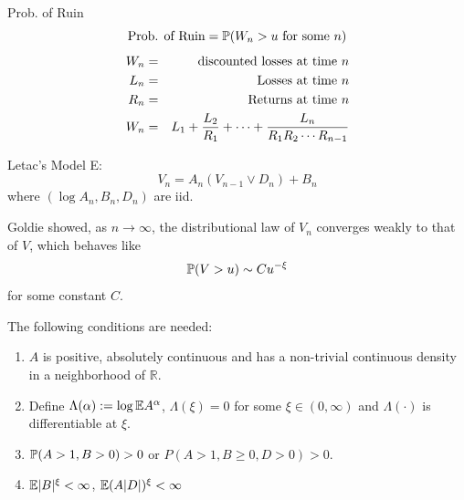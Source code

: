 \documentclass{beamer}
\begin{document}
\begin{frame}
  \begin{exampleblock}{Prob. of Ruin}
    \[
    \text{Prob. of Ruin} = \P(W_n > u \text{ for some }n)
    \]
    \begin{eqnarray*}
      W_n &=& \text{ discounted losses at time } n\\
      L_n &=& \text{ Losses at time } n \\
      R_n &=& \text{ Returns at time } n\\
      W_n &=& L_1 + {L_2 \over R_1} + \cdots +
      {L_n \over R_1 R_2 \cdots R_{n-1}}
    \end{eqnarray*}
  \end{exampleblock}
\end{frame}

\begin{frame}
  Letac's Model E:
  \[
  V_n = A_n (V_{n-1} \vee D_n) + B_n
  \]
  where $(\log A_n, B_n, D_n)$ are iid.

Goldie showed, as $n \to \infty$, the distributional law of $V_n$ converges weakly to
that of $V$, which behaves like
\[
\P(V > u) \sim C u^{-\xi}
\]
for some constant $C$.
\end{frame}

\begin{frame}
  The following conditions are needed:
\begin{enumerate}
\item $A$ is positive, absolutely continuous and has a non-trivial continuous density in
  a neighborhood of $\mathbb R$.
\item Define $\Lambda(\alpha) := \log \E A^\alpha$, $\Lambda(\xi) = 0$ for some $\xi \in (0,
  \infty)$ and $\Lambda(\cdot)$ is differentiable at $\xi$.
\item $\P(A > 1, B > 0) > 0$ or $P(A > 1, B \geq 0, D > 0) > 0$.
\item $\E |B|^\xi < \infty$, $\E (A|D|)^\xi < \infty$
\end{enumerate}
\end{frame}
\end{document}
